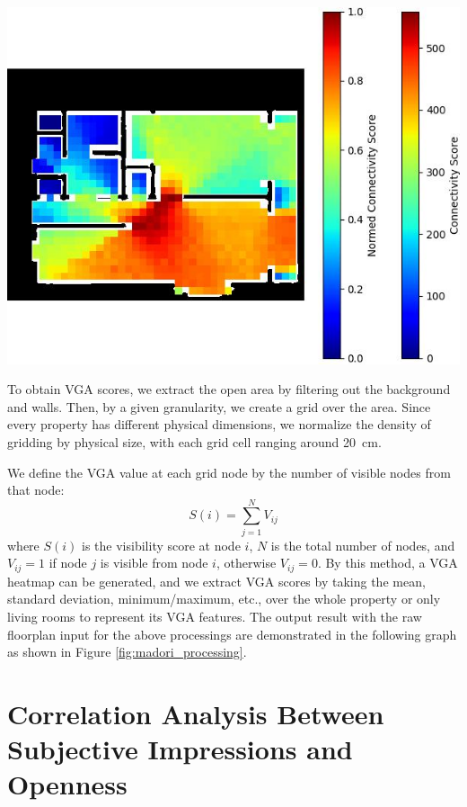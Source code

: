 \documentclass[11pt,a4paper]{article}
\begin{document}
\begin{multicols}{2}
\begin{flushleft}
    \includegraphics[width=0.7\columnwidth]{plots/exp_madori_semseg_vga.jpg}
    \label{fig:madori_processing}
\end{flushleft}

To obtain VGA scores, we extract the open area by filtering out the background 
and walls. Then, by a given granularity, we create a grid over the area. Since every property has different 
physical dimensions, we normalize the density of gridding by physical size, with each grid cell ranging around 20~cm.

We define the VGA value at each grid node by the number of visible nodes from that node:
\begin{equation}
\label{eq:vga_definition}
S(i) = \sum_{j=1}^{N} V_{ij}
\end{equation}
where $S(i)$ is the visibility score at node $i$, $N$ is the total number of nodes, and $V_{ij} = 1$ if node $j$ 
is visible from node $i$, otherwise $V_{ij} = 0$.
By this method, a VGA heatmap can be generated, and we extract VGA scores by taking the mean, standard deviation, 
minimum/maximum, etc., over the whole property or only living rooms to represent its VGA features. 
The output result with the raw floorplan input for the above processings are demonstrated in the following graph 
as shown in Figure \ref{fig:madori_processing}.

\section{Correlation Analysis Between Subjective Impressions and Openness}


\end{multicols}
\end{document}
